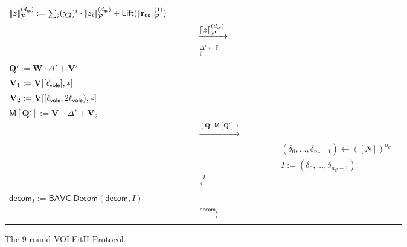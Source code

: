 \documentclass[11pt,a4paper]{article}
\theoremstyle{definition}
\theoremstyle{remark}
\newcommand{\F}{\mathbb{F}}
\newcommand{\calC}{\mathcal{C}}
\newcommand{\itmacP}[1]{\llbracket {#1} \rrbracket_{\calP}}
\newcommand{\calP}{\mathcal{P}}
\newcommand{\mat}[1]{\mathbf{#1}}
\renewcommand{\vec}[1]{\mathbf{#1}}
\newcommand{\msgrightarrow}[1]{\xrightarrow{\textstyle#1}}
\newcommand{\msgleftarrow}[1]{\xleftarrow{\textstyle#1}}
\begin{document}
\begin{figure}[H]
\begin{tabular}{p{0.45\linewidth}>{\centering\arraybackslash}p{0.2\linewidth}p{0.3\linewidth}}
		$ \itmacP{z}^{(d_{\sf qs})} := \sum_{i} (\chi_2)^{i} \cdot \itmacP{z_i}^{(d_{\sf qs})} + \mathsf{Lift}(\itmacP{\vec{r}_{\sf qs}}^{(1)}) $ & & \\
		& $\msgrightarrow{ \itmacP{z}^{(d_{\sf qs})} }$ & \\
		& $\msgleftarrow{ \Delta' \gets \F }$ & \\
		$\mat{Q}' := \mat{W} \cdot \Delta' + \mat{V}'$ & & \\
		$ \mat{V}_1 := \mat{V}[[\ell_{\sf vole}], *]$ & & \\
		$ \mat{V}_2 := \mat{V}[[\ell_{\sf vole}, 2\ell_{\sf vole}), *]$ & & \\
		$\mathsf{M}[\mat{Q}'] := \mat{V}_1 \cdot \Delta' + \mat{V}_2 $ & & \\
		& $\msgrightarrow{ (\mat{Q}', \mathsf{M}[\mat{Q}']) }$ & \\
		& & $(\delta_0, ..., \delta_{n_{\calC} - 1}) \gets ([N])^{n_{\calC}}$ \\
		& & $ I := (\delta_0, ..., \delta_{n_{\calC} - 1}) $ \\
		& $\msgleftarrow{ {I} }$ & \\
		$\mathsf{decom}_{{I}} := \mathsf{BAVC.Decom}(\mathsf{decom}, {I})$ & & \\
		& $\msgrightarrow{\mathsf{decom}_{{I}}}$ & \\
		\bottomrule
	\end{tabular}

	\caption{The 9-round VOLEitH Protocol.}
	\label{fig:9-round-voleith-1}
\end{figure}
\end{document}
